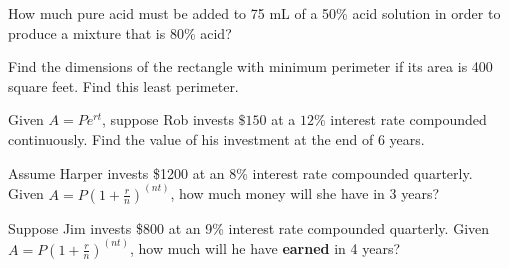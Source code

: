 \documentclass[../main.tex]{subfiles}
\begin{document}
\begin{questions}
    
    \newpage
  
    \question[1] How much pure acid must be added to 75 mL of a 50\% acid solution in order to produce a mixture that is 80\% acid? 
    
    \question[1] Find the dimensions of the rectangle with minimum perimeter if its area is 400 square feet. Find this least perimeter. 
    
    \question[1] Given $A = Pe^{rt}$, suppose Rob invests $\$150$ at a $12\%$ interest rate compounded continuously. Find the value of his investment at the end of 6 years. 
    
    \question[1] Assume Harper invests \$1200 at an 8\% interest rate compounded quarterly. 
    \newline Given $A = P(1 + \frac{r}{n})^{(nt)}$, how much money will she have in 3 years?
    
    \question[1] Suppose Jim invests \$800 at an 9\% interest rate compounded quarterly. 
    \newline Given $A = P(1 + \frac{r}{n})^{(nt)}$, how much will he have \textbf{earned} in 4 years? 
    

\end{questions}
\end{document}
